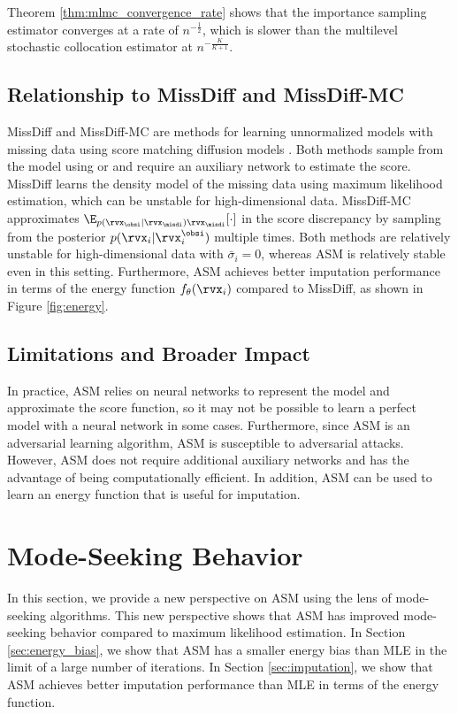 Theorem \ref{thm:mlmc_convergence_rate} shows that the importance sampling estimator converges at a rate of $n^{-\frac{1}{2}}$, which is slower than the multilevel stochastic collocation estimator at $n^{-\frac{K}{K+1}}$.
\subsection{Relationship to MissDiff and MissDiff-MC}
MissDiff and MissDiff-MC are methods for learning unnormalized models with missing data using score matching diffusion models \citep{Ouyang2023}. Both methods sample from the model using \citep{Ho2020} or \citep{Song2019} and require an auxiliary network to estimate the score. MissDiff learns the density model of the missing data using maximum likelihood estimation, which can be unstable for high-dimensional data. MissDiff-MC approximates $\E_{p(\rvx_{\obsi} | \rvx_{\misdi}) \rvx_{\misdi}}[\cdot]$ in the score discrepancy by sampling from the posterior $p(\rvx_{i} | \rvx_{i}^{\obsi})$ multiple times. Both methods are relatively unstable for high-dimensional data with $\bar{\sigma}_{i} = 0$, whereas ASM is relatively stable even in this setting. Furthermore, ASM achieves better imputation performance in terms of the energy function $f_{\theta}(\rvx_{i})$ compared to MissDiff, as shown in Figure \ref{fig:energy}.

\subsection{Limitations and Broader Impact}
\label{subsec:limitations}
In practice, ASM relies on neural networks to represent the model and approximate the score function, so it may not be possible to learn a perfect model with a neural network in some cases. Furthermore, since ASM is an adversarial learning algorithm, ASM is susceptible to adversarial attacks. However, ASM does not require additional auxiliary networks and has the advantage of being computationally efficient. In addition, ASM can be used to learn an energy function that is useful for imputation.


\section{Mode-Seeking Behavior}

\label{sec:mode_seeking}
In this section, we provide a new perspective on ASM using the lens of mode-seeking algorithms. This new perspective shows that ASM has improved mode-seeking behavior compared to maximum likelihood estimation. In Section \ref{sec:energy_bias}, we show that ASM has a smaller energy bias than MLE in the limit of a large number of iterations. In Section \ref{sec:imputation}, we show that ASM achieves better imputation performance than MLE in terms of the energy function.

